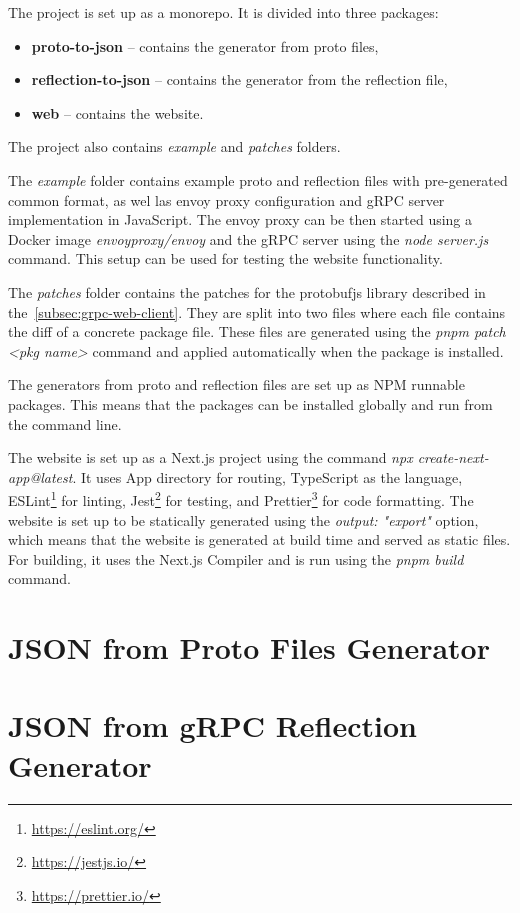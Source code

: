 The project is set up as a monorepo.
It is divided into three packages:
\begin{itemize}
    \item \textbf{proto-to-json} -- contains the generator from proto files,
    \item \textbf{reflection-to-json} -- contains the generator from the reflection file,
    \item \textbf{web} -- contains the website.
\end{itemize}
The project also contains \textit{example} and \textit{patches} folders.

The \textit{example} folder contains example proto and reflection files with pre-generated common format, as wel las envoy proxy configuration and gRPC server implementation in JavaScript.
The envoy proxy can be then started using a Docker image \textit{envoyproxy/envoy} and the gRPC server using the \textit{node server.js} command.
This setup can be used for testing the website functionality.

The \textit{patches} folder contains the patches for the protobufjs library described in the~\ref{subsec:grpc-web-client}.
They are split into two files where each file contains the diff of a concrete package file.
These files are generated using the \textit{pnpm patch <pkg name>} command and applied automatically when the package is installed.

The generators from proto and reflection files are set up as NPM runnable packages.
This means that the packages can be installed globally and run from the command line.

The website is set up as a Next.js project using the command \textit{npx create-next-app@latest}.
It uses App directory for routing, TypeScript as the language, ESLint\footnote{\url{https://eslint.org/}} for linting, Jest\footnote{\url{https://jestjs.io/}} for testing, and Prettier\footnote{\url{https://prettier.io/}} for code formatting.
The website is set up to be statically generated using the \textit{output: "export"} option, which means that the website is generated at build time and served as static files.
For building, it uses the Next.js Compiler and is run using the \textit{pnpm build} command.


\section{JSON from Proto Files Generator}


\section{JSON from gRPC Reflection Generator}


